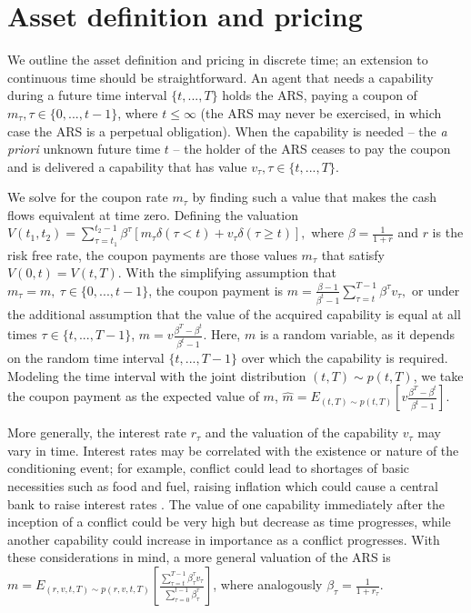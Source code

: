 \documentclass{article}
\begin{document}
\section{Asset definition and pricing}\label{Sec:asset-pricing}

We outline the asset definition and pricing in discrete time; an extension to continuous time should be straightforward.
An agent that needs a capability during a future time interval $\{t,...,T\}$ holds the ARS, paying a coupon of $m_\tau, \tau \in \{0,...,t-1\}$, where $t\leq \infty$ (the ARS may never be exercised, in which case the ARS is a perpetual obligation).
When the capability is needed -- the \textit{a priori} unknown future time $t$ -- the holder of the ARS ceases to pay the coupon and is delivered a capability that has value $v_\tau, \tau \in \{t,...,T\}$.

We solve for the coupon rate $m_\tau$ by finding such a value that makes the cash flows equivalent at time zero.
Defining the valuation $V(t_1, t_2) = \sum_{\tau = t_1}^{t_2-1}\beta^\tau [m_\tau \delta(\tau < t) + v_\tau \delta(\tau \geq t)],$
where $\beta = \frac{1}{1 + r}$ and $r$ is the risk free rate,
the coupon payments are those values $m_\tau$ that satisfy
$V(0, t) = V(t, T)$. 
With the simplifying assumption that $m_\tau = m,\ \tau \in \{0, ..., t-1\}$, the coupon payment is 
$ m = \frac{\beta - 1}{\beta^t - 1}\sum_{\tau = t}^{T-1}\beta^\tau v_\tau,$
or under the additional assumption that the value of the acquired capability
is equal at all times $\tau \in \{t, ..., T - 1\}$,
    $m = v \frac{\beta^T - \beta^t}{\beta^t - 1}.$
Here, $m$ is a random variable, as it depends on the random time interval $\{t, ..., T -1\}$ over which the capability is required.
Modeling the time interval with the joint distribution $(t, T) \sim p(t, T)$, we take the coupon payment as the expected value of $m$,
$\hat m = E_{(t, T) \sim p(t, T)}[ v \frac{\beta^T - \beta^t}{\beta^t - 1}]$.

More generally, the interest rate $r_\tau$ and the valuation of the capability $v_\tau$ may vary in time.
Interest rates may be correlated with the existence or nature of the conditioning event; for example, conflict could lead to shortages of basic necessities such as food and fuel, raising inflation which could cause a central bank to raise interest rates \cite{benjamin1984war}.
The value of one capability immediately after the inception of a conflict could be very high but decrease as time progresses, while another capability could increase in importance as a conflict progresses. 
With these considerations in mind, a more general valuation of the ARS is 
    $m = E_{(r, v, t, T)\sim p(r, v, t, T)}
    [ \frac{\sum_{\tau = t}^{T-1} \beta_\tau^{\tau}v_\tau}{\sum_{\tau = 0}^{t-1}\beta_\tau ^\tau}]$,
where analogously $\beta_\tau = \frac{1}{1 + r_\tau}$.
\end{document}
